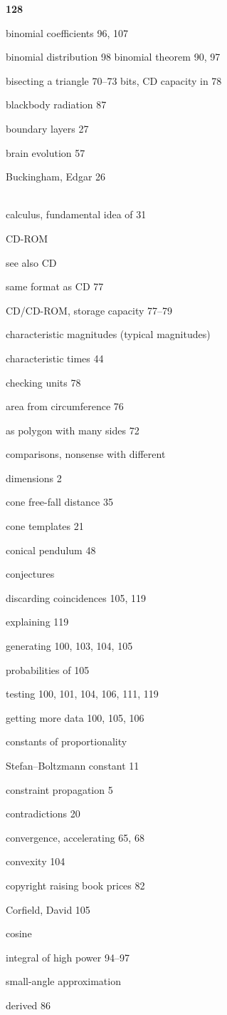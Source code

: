 \documentclass[b5paper]{article}
\begin{document}
\newpage
 \large\textbf{128} \hfill
 \linespread{1.1}
 ~\\
 \normalsize
\setlength{\columnsep}{1cm}
\begin{multicols}{2}


binomial coefficients 96, 107\par
binomial distribution 98\quad\quad
binomial theorem 90, 97\par
bisecting a triangle 70–73\quad\quad
bits, CD capacity in 78\par
blackbody radiation 87\par
boundary layers 27\par\quad
brain evolution 57\par
Buckingham, Edgar 26\par
~\\
calculus, fundamental idea of 31\par
CD-ROM\par\quad
see also CD\par\quad
same format as CD 77\par
CD/CD-ROM, storage capacity 77–79\par
characteristic magnitudes (typical magni\quad tudes)\par
characteristic times 44\par
checking units 78\par\quad
\quad area from circumference 76\par
\quad as polygon with many sides 72\par
comparisons, nonsense with different\par
\quad dimensions 2\par
cone free-fall distance 35\par
cone templates 21\par
conical pendulum 48\par
conjectures\par\quad
discarding coincidences 105, 119\par\quad
explaining 119\par
generating 100, 103, 104, 105\par
probabilities of 105\par\quad
testing 100, 101, 104, 106, 111, 119\par\quad
getting more data 100, 105, 106\par
constants of proportionality\par
Stefan–Boltzmann constant 11\par
constraint propagation 5\par
contradictions 20\par
convergence, accelerating 65, 68\par\quad
convexity 104\par
copyright raising book prices 82\par
Corfield, David 105\par
cosine\par\quad
integral of high power 94–97\par
small-angle approximation\par\quad
derived 86\par


\end{multicols}
\end{document}
